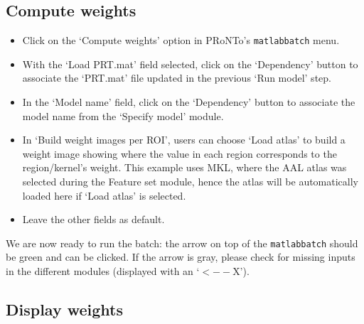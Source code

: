 \subsection{Compute weights}
\begin{itemize}

\item Click on the `Compute weights' option in PRoNTo's {\tt matlabbatch} menu.

\item With the `Load PRT.mat' field selected, click on the `Dependency' button to associate the `PRT.mat' file updated in the previous `Run model' step.

\item In the `Model name' field, click on the `Dependency' button to associate the model name from the `Specify model' module.

\item In `Build weight images per ROI', users can choose `Load atlas' to build a weight image showing where the value in each region corresponds to the region/kernel's weight. This example uses MKL, where the AAL atlas was selected during the Feature set module, hence the atlas will be automatically loaded here if `Load atlas' is selected.  

\item Leave the other fields as default.

\end{itemize}

We are now ready to run the batch: the arrow on top of the {\tt matlabbatch} should be green and can be clicked. If the arrow is gray, please check for missing inputs in the different modules (displayed with an `$<--$X').




\subsection{Display weights}

